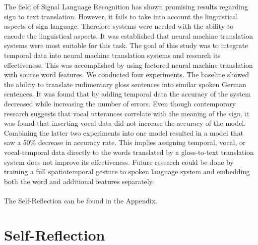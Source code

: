 The field of Signal Language Recognition has shown promising results regarding sign to text translation. However, it fails to take into account the linguistical aspects of sign language. Therefore systems were needed with the ability to encode the linguistical aspects. It was established that neural machine translation systems were most suitable for this task. The goal of this study was to integrate temporal data into neural machine translation systems and research its effectiveness. This was accomplished by using factored neural machine translation with source word features. We conducted four experiments. The baseline showed the ability to translate rudimentary gloss sentences into similar spoken German sentences. It was found that by adding temporal data the accuracy of the system decreased while increasing the number of errors. Even though contemporary research suggests that vocal utterances correlate with the meaning of the sign, it was found that inserting vocal data did not increase the accuracy of the model. Combining the latter two experiments into one model resulted in a model that saw a 50\% decrease in accuracy rate. This implies assigning temporal, vocal, or vocal-temporal data directly to the words translated by a gloss-to-text translation system does not improve its effectiveness. Future research could be done by training a full spatiotemporal gesture to spoken language system and embedding both the word and additional features separately.
\\
\\
The Self-Reflection can be found in the Appendix.



\section{Self-Reflection}

